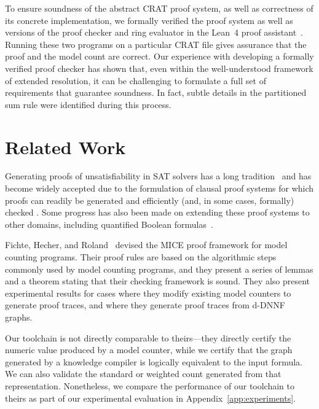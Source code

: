 \documentclass[letterpaper,USenglish,cleveref, autoref, thm-restate]{lipics-v2021}
\newcommand{\lean}{Lean~4}
\begin{document}
To ensure soundness of the abstract CRAT proof system, as well as correctness of its
concrete implementation, we formally verified the proof system as well as versions
of the proof checker and ring evaluator in the \lean{} proof assistant~\cite{demoura:cade:2021}.
Running these two programs on a particular CRAT file gives assurance that the proof
and the model count are correct. Our experience with developing a formally verified
proof checker has shown that, even within the well-understood framework of extended
resolution, it can be challenging to formulate a full set of requirements that guarantee soundness.
In fact, subtle details in the partitioned sum rule were identified during this process.

\section{Related Work}

Generating proofs of unsatisfiability in SAT solvers has a long
tradition~\cite{ZhangMalik} and has become widely accepted due to the
formulation of clausal proof systems for which proofs can readily be
generated and efficiently (and, in some cases, formally) checked
\cite{cruz-cade-2017,RAT,Tan:2021,wetzler14_drattrim}.  Some progress
has also been made on extending these proof systems to other domains,
including quantified Boolean
formulas~\cite{bryant:cade:2021,heule:JAR2014}.

Fichte, Hecher, and Roland~\cite{fichte:sat:2022} devised the MICE
proof framework for model counting programs.  Their proof rules are
based on the algorithmic steps commonly used by model counting
programs, and they present a series of lemmas and a theorem stating
that their checking framework is sound.  They also present
experimental results for cases where they modify existing model
counters to generate proof traces, and where they generate proof
traces from d-DNNF graphs.

Our toolchain is not directly comparable to theirs---they directly
certify the numeric value produced by a model counter, while we 
certify that the graph generated by a knowledge compiler is logically
equivalent to the input formula.  We can also validate the standard or
weighted count generated from that representation.
Nonetheless,
we compare the performance of our toolchain to theirs as part of our
experimental evaluation in Appendix~\ref{app:experiments}.
\end{document}
